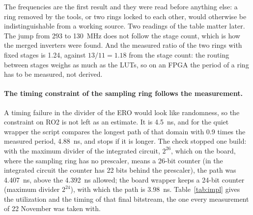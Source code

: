The frequencies are the first result and they were read before anything
else: a ring removed by the tools, or two rings locked to each other,
would otherwise be indistinguishable from a working source. Two readings
of the table matter later. The jump from 293 to 130~MHz does not follow
the stage count, which is how the merged inverters were found. And the
measured ratio of the two rings with fixed stages is 1.24, against
$13/11 = 1.18$ from the stage count: the routing between stages weighs as
much as the \acp{LUT}, so on an \ac{FPGA} the period of a ring has to be
measured, not derived.

\paragraph{The timing constraint of the sampling ring follows the
measurement.} A timing failure in the divider of the \ac{ERO} would look
like randomness, so the constraint on RO2 is not left as an estimate. It
is 4.5~ns, and for the quiet wrapper the script compares the longest
path of that domain with 0.9 times the measured period, 4.88~ns, and
stops if it is longer. The check stopped one build: with the maximum
divider of the integrated circuit, $2^{26}$, which on the board, where
the sampling ring has no prescaler, means a 26-bit counter (in the
integrated circuit the counter has 22 bits behind the prescaler), the
path was 4.407~ns, above the 4.392~ns allowed; the board wrapper keeps a
24-bit counter (maximum divider $2^{24}$), with which the path is
3.98~ns.
Table~\ref{tab:impl} gives the utilization and the timing of that final
bitstream, the one every measurement of 22 November was taken with.

